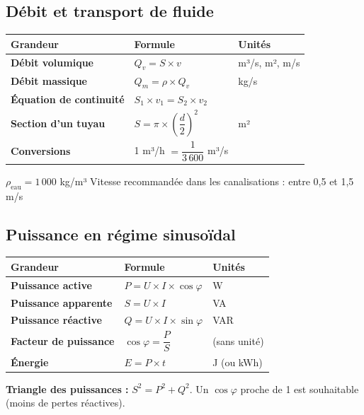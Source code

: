 \documentclass[a4paper,11pt]{article}
\begin{document}
\begin{formulairebox}

\subsection*{Débit et transport de fluide}

\begin{tabular}{>{\bfseries}p{4.5cm} p{5.5cm} p{4cm}}
\toprule
\textbf{Grandeur} & \textbf{Formule} & \textbf{Unités} \\
\midrule
Débit volumique & $Q_v = S \times v$ & m³/s, m², m/s \\[4pt]
Débit massique & $Q_m = \rho \times Q_v$ & kg/s \\[4pt]
Équation de continuité & $S_1 \times v_1 = S_2 \times v_2$ & \\[4pt]
Section d'un tuyau & $S = \pi \times \left(\dfrac{d}{2}\right)^2$ & m² \\[6pt]
Conversions & 1 m³/h $= \dfrac{1}{3\,600}$ m³/s & \\[4pt]
\bottomrule
\end{tabular}

\smallskip
$\rho_{\text{eau}} = 1\,000$ kg/m³ \quad Vitesse recommandée dans les canalisations : entre 0,5 et 1,5 m/s

\subsection*{Puissance en régime sinusoïdal}

\begin{tabular}{>{\bfseries}p{4.5cm} p{5.5cm} p{4cm}}
\toprule
\textbf{Grandeur} & \textbf{Formule} & \textbf{Unités} \\
\midrule
Puissance active & $P = U \times I \times \cos\varphi$ & W \\[4pt]
Puissance apparente & $S = U \times I$ & VA \\[4pt]
Puissance réactive & $Q = U \times I \times \sin\varphi$ & VAR \\[4pt]
Facteur de puissance & $\cos\varphi = \dfrac{P}{S}$ & (sans unité) \\[6pt]
Énergie & $E = P \times t$ & J (ou kWh) \\[4pt]
\bottomrule
\end{tabular}

\smallskip
\textbf{Triangle des puissances :} $S^2 = P^2 + Q^2$. Un $\cos\varphi$ proche de 1 est souhaitable (moins de pertes réactives).

\end{formulairebox}
\end{document}
